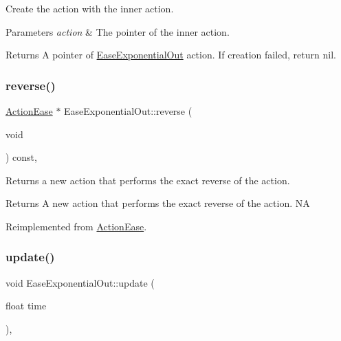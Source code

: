 Create the action with the inner action. 


\begin{DoxyParams}{Parameters}
{\em action} & The pointer of the inner action. \\
\hline
\end{DoxyParams}
\begin{DoxyReturn}{Returns}
A pointer of \hyperlink{classEaseExponentialOut}{Ease\+Exponential\+Out} action. If creation failed, return nil. 
\end{DoxyReturn}
\mbox{\label{classEaseExponentialOut_a99fbc2a18b0b61cfbb2a17414eb9119f}} 
\subsubsection{\texorpdfstring{reverse()}{reverse()}}
{\footnotesize\ttfamily \hyperlink{classActionEase}{Action\+Ease} $\ast$ Ease\+Exponential\+Out\+::reverse (\begin{DoxyParamCaption}\item[{void}]{ }\end{DoxyParamCaption}) const\hspace{0.3cm}{\ttfamily [override]}, {\ttfamily [virtual]}}

Returns a new action that performs the exact reverse of the action.

\begin{DoxyReturn}{Returns}
A new action that performs the exact reverse of the action.  NA 
\end{DoxyReturn}


Reimplemented from \hyperlink{classActionEase_ab99eb083fa033fae1d6c948fdc730782}{Action\+Ease}.

\mbox{\label{classEaseExponentialOut_acbd15c86c12116c3482640a3f8f83d5f}} 
\subsubsection{\texorpdfstring{update()}{update()}}
{\footnotesize\ttfamily void Ease\+Exponential\+Out\+::update (\begin{DoxyParamCaption}\item[{float}]{time }\end{DoxyParamCaption})\hspace{0.3cm}{\ttfamily [override]}, {\ttfamily [virtual]}}

